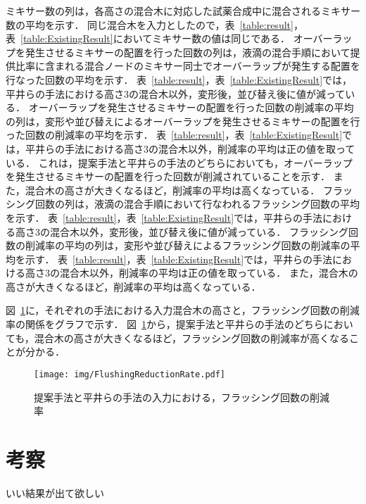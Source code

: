 ミキサー数の列は，各高さの混合木に対応した試薬合成中に混合されるミキサー数の平均を示す．
同じ混合木を入力としたので，表~\ref{table:result}，表~\ref{table:ExistingResult}においてミキサー数の値は同じである．
オーバーラップを発生させるミキサーの配置を行った回数の列は，液滴の混合手順において提供比率に含まれる混合ノードのミキサー同士でオーバーラップが発生する配置を行なった回数の平均を示す．
表~\ref{table:result}，表~\ref{table:ExistingResult}では，平井らの手法における高さ3の混合木以外，変形後，並び替え後に値が減っている．
オーバーラップを発生させるミキサーの配置を行った回数の削減率の平均の列は，変形や並び替えによるオーバーラップを発生させるミキサーの配置を行った回数の削減率の平均を示す．
表~\ref{table:result}，表~\ref{table:ExistingResult}では，平井らの手法における高さ3の混合木以外，削減率の平均は正の値を取っている．
これは，提案手法と平井らの手法のどちらにおいても，オーバーラップを発生させるミキサーの配置を行った回数が削減されていることを示す．
また，混合木の高さが大きくなるほど，削減率の平均は高くなっている．
フラッシング回数の列は，液滴の混合手順において行なわれるフラッシング回数の平均を示す．
表~\ref{table:result}，表~\ref{table:ExistingResult}では，平井らの手法における高さ3の混合木以外，変形後，並び替え後に値が減っている．
フラッシング回数の削減率の平均の列は，変形や並び替えによるフラッシング回数の削減率の平均を示す．
表~\ref{table:result}，表~\ref{table:ExistingResult}では，平井らの手法における高さ3の混合木以外，削減率の平均は正の値を取っている．
また，混合木の高さが大きくなるほど，削減率の平均は高くなっている．

図~\ref{fig:FlushingReductionRate}に，それぞれの手法における入力混合木の高さと，フラッシング回数の削減率の関係をグラフで示す．
図~\ref{fig:FlushingReductionRate}から，提案手法と平井らの手法のどちらにおいても，混合木の高さが大きくなるほど，フラッシング回数の削減率が高くなることが分かる．

\begin{figure}[tbp]
 \centering\texttt{[image: img/FlushingReductionRate.pdf]}

 \caption{提案手法と平井らの手法の入力における，フラッシング回数の削減率}\label{fig:FlushingReductionRate}
\end{figure}

\section{考察}
いい結果が出て欲しい
